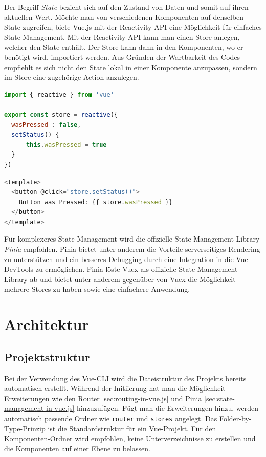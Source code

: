 Der Begriff \emph{State} bezieht sich auf den Zustand von Daten und somit auf ihren aktuellen Wert.
Möchte man von verschiedenen Komponenten auf denselben State zugreifen,
biete Vue.js mit der Reactivity API eine Möglichkeit für einfaches State Management.
Mit der Reactivity API kann man einen Store anlegen, welcher den State enthält.
Der Store kann dann in den Komponenten, wo er benötigt wird, importiert werden.
Aus Gründen der Wartbarkeit des Codes empfiehlt es sich nicht den State lokal in einer Komponente anzupassen,
sondern im Store eine zugehörige Action anzulegen. \cite{vueStateManagement}

\begin{lstlisting}[caption={Anlegen eines Stores mit Reactivity API},language=javascript,label={lst:Anlegen-Store}]
import { reactive } from 'vue'

export const store = reactive({
  wasPressed : false,
  setStatus() {
      this.wasPressed = true
  }
})
\end{lstlisting}

\begin{lstlisting}[caption={Vewendung des Stores},language=javascript,label={lst:Verwendung-Store}]
<template>
  <button @click="store.setStatus()">
    Button was Pressed: {{ store.wasPressed }}
  </button>
</template>
\end{lstlisting}

Für komplexeres State Management wird die offizielle State Management Library \emph{Pinia} empfohlen.
Pinia bietet unter anderem die Vorteile serverseitiges Rendering zu unterstützen und
ein besseres Debugging durch eine Integration in die Vue-DevTools zu ermöglichen.
Pinia löste Vuex als offizielle State Management Library ab und bietet unter anderem gegenüber von Vuex
die Möglichkeit mehrere Stores zu haben sowie eine einfachere Anwendung.  \cite{vueStateManagement}


\section{Architektur}

\subsection*{Projektstruktur}
Bei der Verwendung des Vue-CLI wird die Dateistruktur des Projekts bereits automatisch erstellt.
Während der Initiierung hat man die Möglichkeit Erweiterungen wie den Router \ref{sec:routing-in-vue.js} und Pinia \ref{sec:state-management-in-vue.js} hinzuzufügen.
Fügt man die Erweiterungen hinzu, werden automatisch passende Ordner wie \texttt{router} und \texttt{stores} angelegt.
Das Folder-by-Type-Prinzip ist die Standardstruktur für ein Vue-Projekt.
Für den Komponenten-Ordner wird empfohlen, keine Unterverzeichnisse zu erstellen und
die Komponenten auf einer Ebene zu belassen. \cite{largeScaleVue}

